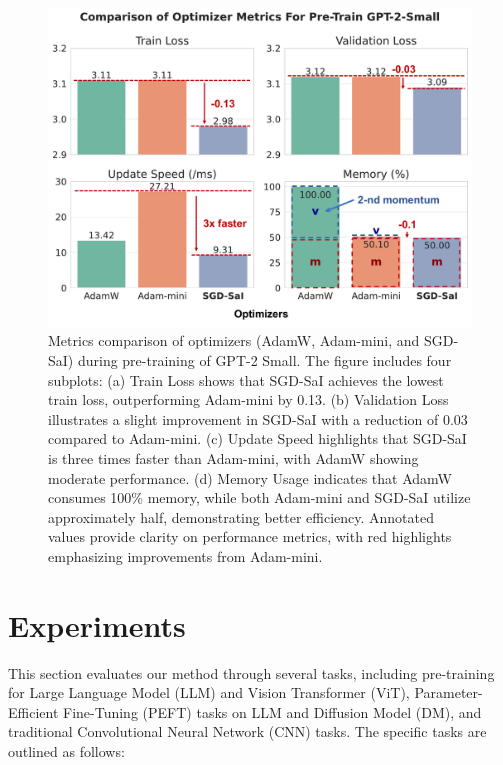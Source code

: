 \begin{figure}[!ht]
    \centering
    \includegraphics[width=\linewidth]{images/gpt2_exp_results.pdf}
    \caption{Metrics comparison of optimizers (AdamW, Adam-mini, and SGD-SaI) during pre-training of GPT-2 Small. The figure includes four subplots: (a) Train Loss shows that SGD-SaI achieves the lowest train loss, outperforming Adam-mini by 0.13. (b) Validation Loss illustrates a slight improvement in SGD-SaI with a reduction of 0.03 compared to Adam-mini. (c) Update Speed highlights that SGD-SaI is three times faster than Adam-mini, with AdamW showing moderate performance. (d) Memory Usage indicates that AdamW consumes 100\% memory, while both Adam-mini and SGD-SaI utilize approximately half, demonstrating better efficiency. Annotated values provide clarity on performance metrics, with red highlights emphasizing improvements from Adam-mini.}
    \label{fig:optimizer_metrics_comparison}
\end{figure}



\section{Experiments}
\label{sec:results}

This section evaluates our method through several tasks, including pre-training for Large Language Model (LLM) and Vision Transformer (ViT), Parameter-Efficient Fine-Tuning (PEFT) tasks on LLM and Diffusion Model (DM), and traditional Convolutional Neural Network (CNN) tasks. The specific tasks are outlined as follows:

